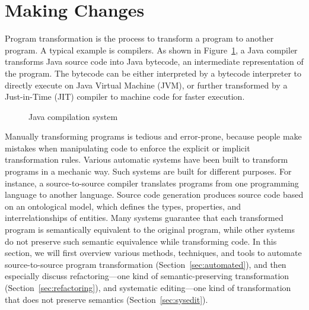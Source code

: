 \section{Making Changes}
Program transformation is the process to transform a program to another program. A typical example is compilers. As shown in Figure~\ref{fig:javacompilation}, a Java compiler transforms Java source code into Java bytecode, an intermediate representation of the program. The bytecode can be either interpreted by a bytecode interpreter to directly execute on Java Virtual Machine (JVM), or further transformed by a Just-in-Time (JIT) compiler to machine code for faster execution.

\begin{figure}
\centering
{}
\caption{Java compilation system}
\label{fig:javacompilation}
\end{figure}

Manually transforming programs is tedious and error-prone, because people make mistakes when manipulating code to enforce the explicit or implicit transformation rules.
Various automatic systems have been built to transform programs in a mechanic way. Such systems are built for different purposes. For instance, a source-to-source compiler translates programs from one programming language to another language. Source code generation produces source code based on an ontological model, which defines the types, properties, and interrelationships of entities. 
Many systems guarantee that each transformed program is semantically equivalent to the original program, while other systems do not preserve such semantic equivalence while transforming code. In this section, we will first overview various methods, techniques, and tools to automate source-to-source program transformation (Section~\ref{sec:automated}), and then especially discuss refactoring---one kind of semantic-preserving transformation (Section~\ref{sec:refactoring}), and systematic editing---one kind of transformation that does not preserve semantics (Section~\ref{sec:sysedit}).


